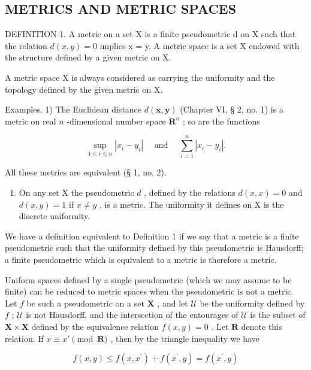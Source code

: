 \subsection{METRICS AND METRIC SPACES}

DEFINITION 1. A metric on a set X is a finite pseudometric d on X such that the relation \(d(x, y) = 0\) implies x = y. A metric space is a set X endowed with the structure defined by a given metric on X.

A metric space X is always considered as carrying the uniformity and the topology defined by the given metric on X.

Examples. 1) The Euclidean distance \(d(\pmb{x}, \pmb{y})\) (Chapter VI, § 2, no. 1) is a metric on real \(n\) -dimensional number space \(\mathbf{R}^n\) ; so are the functions

\[
\sup _ {1 \leqslant i \leqslant n} | x _ {i} - y _ {i} | \quad \text { and } \quad \sum_ {i = 1} ^ {n} | x _ {i} - y _ {i} |.
\]

All these metrics are equivalent (§ 1, no. 2).

\begin{enumerate}
\def\labelenumi{\arabic{enumi})}
\setcounter{enumi}{1}
\tightlist
\item
  On any set X the pseudometric \(d\) , defined by the relations \(d(x, x) = 0\) and \(d(x, y) = 1\) if \(x \neq y\) , is a metric. The uniformity it defines on X is the discrete uniformity.
\end{enumerate}

We have a definition equivalent to Definition 1 if we say that a metric is a finite pseudometric such that the uniformity defined by this pseudometric is Hausdorff; a finite pseudometric which is equivalent to a metric is therefore a metric.

Uniform spaces defined by a single pseudometric (which we may assume to be finite) can be reduced to metric spaces when the pseudometric is not a metric. Let \(f\) be such a pseudometric on a set \(\mathbf{X}\) , and let \(\mathcal{U}\) be the uniformity defined by \(f\) ; \(\mathcal{U}\) is not Hausdorff, and the intersection of the entourages of \(\mathcal{U}\) is the subset of \(\mathbf{X} \times \mathbf{X}\) defined by the equivalence relation \(f(x,y) = 0\) . Let \(\mathbf{R}\) denote this relation. If \(x \equiv x' \pmod{\mathbf{R}}\) , then by the triangle inequality we have

\[
f (x, y) \leqslant f (x, x ^ {\prime}) + f (x ^ {\prime}, y) = f (x ^ {\prime}, y)
\]

